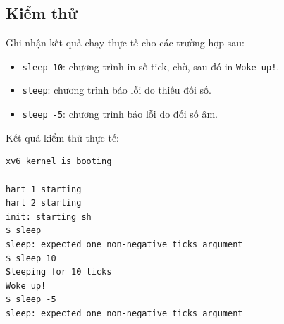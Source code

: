 \subsection{Kiểm thử}
Ghi nhận kết quả chạy thực tế cho các trường hợp sau:
\begin{itemize}
  \item \texttt{sleep 10}: chương trình in số tick, chờ, sau đó in \texttt{Woke up!}.
  \item \texttt{sleep}: chương trình báo lỗi do thiếu đối số.
  \item \texttt{sleep -5}: chương trình báo lỗi do đối số âm.
\end{itemize}

\noindent Kết quả kiểm thử thực tế:

\begin{center}
\begin{minipage}{0.86\textwidth}
\begin{lstlisting}[numbers=none,xleftmargin=0pt,framexleftmargin=0pt]
xv6 kernel is booting

hart 1 starting
hart 2 starting
init: starting sh
$ sleep
sleep: expected one non-negative ticks argument
$ sleep 10
Sleeping for 10 ticks
Woke up!
$ sleep -5
sleep: expected one non-negative ticks argument
\end{lstlisting}
\end{minipage}
\end{center}
